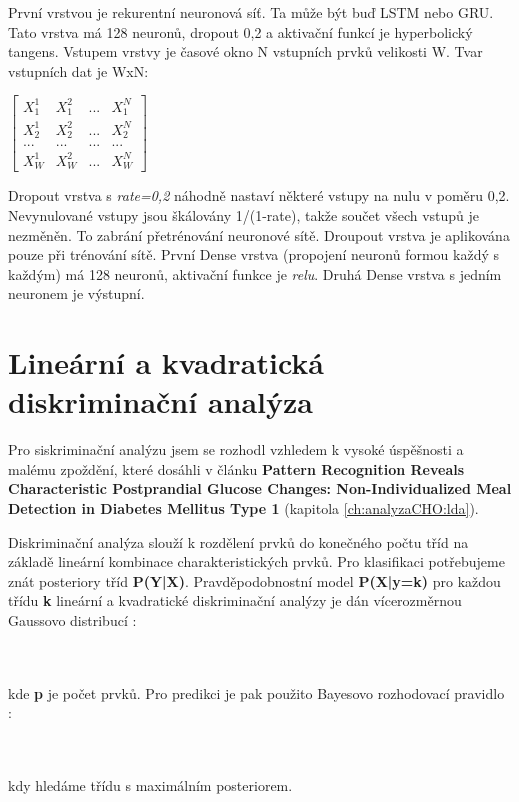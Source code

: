 První vrstvou je rekurentní neuronová síť. Ta může být buď LSTM nebo GRU. Tato vrstva má 128 neuronů, dropout 0,2 a aktivační funkcí je hyperbolický tangens. Vstupem vrstvy je časové okno N vstupních prvků velikosti W. Tvar vstupních dat je WxN:

$\begin{bmatrix}
X^{1}_{1} & X^{2}_{1} & ... & X^{N}_{1}\\
X^{1}_{2} & X^{2}_{2} & ... & X^{N}_{2}\\
... & ... & ... & ...\\
X^{1}_{W} & X^{2}_{W} & ... & X^{N}_{W}
\end{bmatrix}$

Dropout vrstva s \textit{rate=0,2} náhodně nastaví některé vstupy na nulu v poměru 0,2. Nevynulované vstupy jsou škálovány 1/(1-rate), takže součet všech vstupů je nezměněn. To zabrání přetrénování neuronové sítě. Droupout vrstva je aplikována pouze při trénování sítě. První Dense vrstva (propojení neuronů formou každý s každým) má 128 neuronů, aktivační funkce je \textit{relu}. Druhá Dense vrstva s jedním neuronem je výstupní.


\section{Lineární a kvadratická diskriminační analýza}
\label{ch:lda_qda}

Pro siskriminační analýzu jsem se rozhodl vzhledem k vysoké úspěšnosti a malému zpoždění, které dosáhli \citet{analyzaCHO.LDA} v článku \textbf{Pattern Recognition Reveals Characteristic Postprandial Glucose Changes: Non-Individualized Meal Detection in Diabetes Mellitus Type 1} (kapitola \ref{ch:analyzaCHO:lda}).

Diskriminační analýza slouží k rozdělení prvků do konečného počtu tříd na základě lineární kombinace charakteristických prvků. Pro klasifikaci potřebujeme znát posteriory tříd \textbf{P(Y|X)}. Pravděpodobnostní model \textbf{P(X|y=k)} pro každou třídu \textbf{k} lineární a kvadratické diskriminační analýzy je dán vícerozměrnou Gaussovo distribucí \citep{cho.book.lda}:

\\\\
kde \textbf{p} je počet prvků. Pro predikci je pak použito Bayesovo rozhodovací pravidlo \citep{cho.book.lda}:

\\\\
kdy hledáme třídu s maximálním posteriorem.

